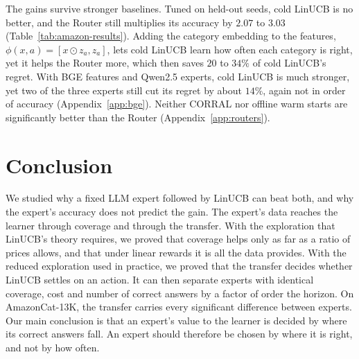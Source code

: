 \documentclass[anon]{alt2027} %
\newif\ifrevmarks\revmarkstrue
\newenvironment{revised}{\ifrevmarks\color{revcolor}\fi}{}
\begin{document}
\begin{revised}
The gains survive stronger baselines. Tuned on held-out seeds, cold LinUCB
is no better, and the Router still multiplies its accuracy by $2.07$ to
$3.03$ (Table~\ref{tab:amazon-results}). Adding the category embedding to
the features, $\phi(x,a)=[x\odot z_a,z_a]$, lets cold LinUCB learn how often
each category is right, yet it helps the Router more, which then saves $20$
to $34\%$ of cold LinUCB's regret. With BGE features and Qwen2.5 experts,
cold LinUCB is much stronger, yet two of the three experts still cut its
regret by about $14\%$, again not in order of accuracy
(Appendix~\ref{app:bge}). Neither CORRAL nor offline warm starts are
significantly better than the Router (Appendix~\ref{app:routers}).
\end{revised}

\section{Conclusion}
\label{sec:conclusion}

\begin{revised}
We studied why a fixed LLM expert followed by LinUCB can beat both, and why
the expert's accuracy does not predict the gain. The expert's data reaches
the learner through coverage and through the transfer. With the exploration
that LinUCB's theory requires, we proved that coverage helps only as far as
a ratio of prices allows, and that under linear rewards it is all the data
provides. With the reduced exploration used in practice, we proved that the
transfer decides whether LinUCB settles on an action. It can then separate
experts with identical coverage, cost and number of correct answers by a
factor of order the horizon. On AmazonCat-13K, the transfer carries every
significant difference between experts. Our main conclusion is that an
expert's value to the learner is decided by where its correct answers fall.
An expert should therefore be chosen by where it is right, and not by how
often.
\end{revised}
\end{document}
